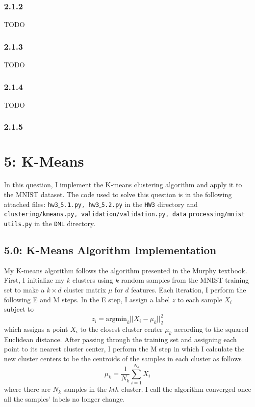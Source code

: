 \documentclass[12pt]{amsart}
\begin{document}
\subsubsection*{2.1.2}

TODO

\subsubsection*{2.1.3}

TODO

\subsubsection*{2.1.4}

TODO

\subsubsection*{2.1.5}

\section*{5: K-Means}

In this question, I implement the K-means clustering algorithm and apply it to the MNIST dataset.  The code used to solve this question is in the following attached files: {\tt hw3$\_$5.1.py, hw3$\_$5.2.py} in the {\tt HW3} directory and {\tt clustering/kmeans.py, validation/validation.py, data$\_$processing/mnist$\_$utils.py} in the {\tt DML} directory.

\subsection*{5.0: K-Means Algorithm Implementation}

My K-means algorithm follows the algorithm presented in the Murphy textbook.  First, I initialize my $k$ clusters using $k$ random samples from the MNIST training set to make a $k \times d$ cluster matrix $\mu$ for $d$ features.  Each iteration, I perform the following E and M steps.  In the E step, I assign a label $z$ to each sample $X_i$ subject to
\begin{equation} \label{eqn:E_step}
z_i = \text{argmin}_k ||X_i - \mu_k ||_2^2
\end{equation}
which assigns a point $X_i$ to the closest cluster center $\mu_k$ according to the squared Euclidean distance.  After passing through the training set and assigning each point to its nearest cluster center, I perform the M step in which I calculate the new cluster centers to be the centroids of the samples in each cluster as follows
\begin{equation} \label{eqn:M_step}
\mu_k = \frac{1}{N_k} \sum_{i = 1}^{N_k} X_i
\end{equation}
where there are $N_k$ samples in the $kth$ cluster.  I call the algorithm converged once all the samples' labels no longer change.
\end{document}
